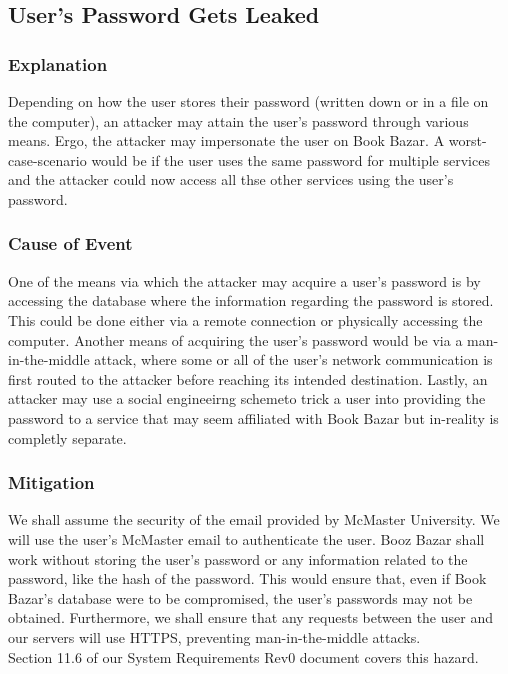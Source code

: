 \documentclass[fullpage]{article}
\begin{document}
\subsection{User's Password Gets Leaked}

\subsubsection*{Explanation}
Depending on how the user stores their password (written down or in a file on the computer), an attacker may attain the user's password through various means. Ergo, the attacker may impersonate the user on Book Bazar. A worst-case-scenario would be if the user uses the same password for multiple services and the attacker could now access all thse other services using the user's password. 

\subsubsection*{Cause of Event}
One of the means via which the attacker may acquire a user's password is by accessing the database where the information regarding the password is stored. This could be done either via a remote connection or physically accessing the computer. Another means of acquiring the user's password would be  via a man-in-the-middle attack, where some or all of the user's network communication is first routed to the attacker before reaching its intended destination. Lastly, an attacker may use a social engineeirng schemeto trick a user into providing the password to a service that may seem affiliated with Book Bazar but in-reality is completly separate.

\subsubsection*{Mitigation}
We shall assume the security of the email provided by McMaster University. We will use the user's McMaster email to authenticate the user. Booz Bazar shall work without storing the user's password or any information related to the password, like the hash of the password. This would ensure that, even if Book Bazar's database were to be compromised, the user's passwords may not be obtained. Furthermore, we shall ensure that any requests between the user and our servers will use HTTPS, preventing man-in-the-middle attacks.\\
\newline
Section 11.6 of our System Requirements Rev0 document covers this hazard.
\end{document}
